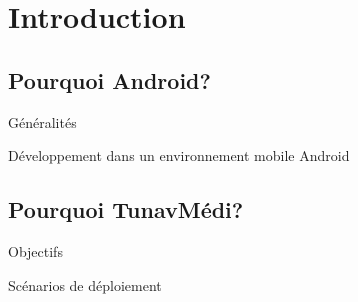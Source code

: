 \section{Introduction}
\subsection{Pourquoi Android?}

\begin{frame}{Généralités}%
\only<+>{
	
}
\only<+>{
	
}
\end{frame}

\begin{frame}{Développement dans un environnement mobile Android} %
\end{frame}

\subsection{Pourquoi TunavMédi?}%
\begin{frame}{Objectifs}

\end{frame}

\begin{frame}{Scénarios de déploiement}
\only<+>{
	
}

\only<+>{
	
}
\end{frame}
